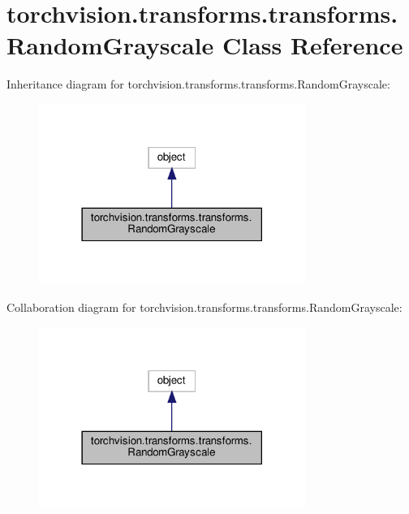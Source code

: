 \hypertarget{classtorchvision_1_1transforms_1_1transforms_1_1RandomGrayscale}{}\section{torchvision.\+transforms.\+transforms.\+Random\+Grayscale Class Reference}
\label{classtorchvision_1_1transforms_1_1transforms_1_1RandomGrayscale}


Inheritance diagram for torchvision.\+transforms.\+transforms.\+Random\+Grayscale\+:
\nopagebreak
\begin{figure}[H]
\begin{center}
\leavevmode
\includegraphics[width=246pt]{classtorchvision_1_1transforms_1_1transforms_1_1RandomGrayscale__inherit__graph}
\end{center}
\end{figure}


Collaboration diagram for torchvision.\+transforms.\+transforms.\+Random\+Grayscale\+:
\nopagebreak
\begin{figure}[H]
\begin{center}
\leavevmode
\includegraphics[width=246pt]{classtorchvision_1_1transforms_1_1transforms_1_1RandomGrayscale__coll__graph}
\end{center}
\end{figure}
